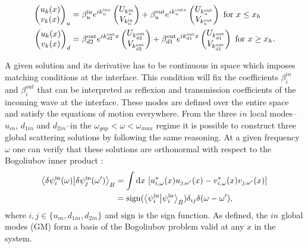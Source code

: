 \begin{align}
    \begin{pmatrix}
        u_k(x) \\
        v_k(x)
    \end{pmatrix}_{u} &=\beta^{\mathrm{in}}_ue^{{ik_u^{{\mathrm{in}}x}}}\begin{pmatrix}
        U_{k^\mathrm{in}_{u}} \\
        V_{k^\mathrm{in}_{u}}
    \end{pmatrix}
    +
    \beta^{\mathrm{out}}_u e^{ik_u^{{\mathrm{out}}x}}\begin{pmatrix}
        U_{k^\mathrm{out}_{u}} \\
        V_{k^\mathrm{out}_{u}}
    \end{pmatrix} \ \mathrm{for} \ x\leq x_h \\
    \begin{pmatrix}
        u_k(x) \\
        v_k(x)
    \end{pmatrix}_{d} &= \beta^{\mathrm{out}}_{d2} e^{ik^{\mathrm{out}}_{d2}x}
    \begin{pmatrix}
        U_{k^\mathrm{out}_{d2}} \\
        V_{k^\mathrm{out}_{d2}}
    \end{pmatrix} + \beta^{\mathrm{out}}_{d1} e^{ik^{\mathrm{out}}_{d1}x}
    \begin{pmatrix}
        U_{k^\mathrm{out}_{d1}} \\
        V_{k^\mathrm{out}_{d1}} 
    \end{pmatrix} \ \mathrm{for} \ x\geq x_h.
\end{align}

A given solution and its derivative has to be continuous in space which imposes matching conditions at the interface. This condition will fix the coefficients $\beta_i^{in}$ and $\beta_i^{out}$ that can be interpreted as reflexion and transmission coefficients of the incoming wave at the interface. 
These modes are defined over the entire space and satisfy the equations of motion everywhere. From the three $in$ local modes--$u_{in}$, $d_{1in}$ and $d_{2in}$--in the $\omega_{gap}<\omega<\omega_{max}$ regime it is possible to construct three global scattering solutions by following the same reasoning. At a given frequency $\omega$ one can verify that these solutions are orthonormal with respect to the Bogoliubov inner product :
\begin{equation}
    \begin{aligned}
    \bra{\dpsi^\mathrm{in}_i(\omega)}\ket{\dpsi^\mathrm{in}_j(\omega')}_B &= \int \mathrm{d}x  \ [u^*_{i,\omega}(x)u_{j,\omega'}(x)-v^*_{i,\omega}(x)v_{j,\omega'}(x)]  \\
    &= \mathrm{sign}(\bra{\psi^\mathrm{in}_i}\ket{\psi^\mathrm{in}_i}_B)\delta_{ij}\delta(\omega-\omega'),
    \end{aligned}
    \label{eq:in_global_modes}
\end{equation} 
where $i,j \in \{u_{in},d_{1in},d_{2in}\}$ and $\mathrm{sign}$ is the sign function. 
As defined, the $in$ global modes (GM) form a basis of the Bogoliubov problem valid at any $x$ in the system.

